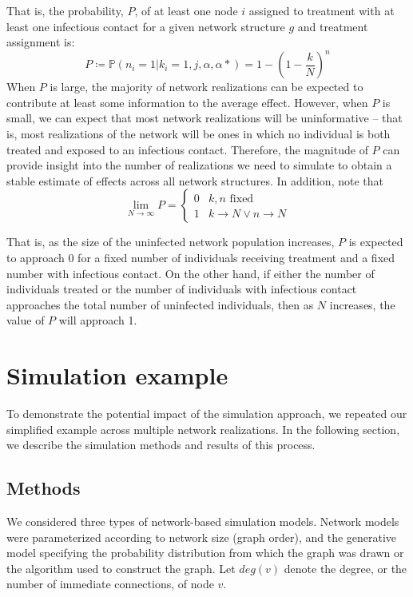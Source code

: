 \documentclass{article}
\theoremstyle{definition}
\begin{document}
That is, the probability, $P$, of at least one node $i$ assigned to treatment with at least one infectious contact for a given network structure $g$ and treatment assignment is:
\begin{equation}\label{eq:18}
    P \coloneqq \mathbb{P}\left(n_{i}=1 \vert k_{i}=1,j,\alpha,\alpha*\right)=1-\left(1-\frac{k}{N}\right)^{n}
\end{equation}
When $P$ is large, the majority of network realizations can be expected to contribute at least some information to the average effect. However, when $P$ is small, we can expect that most network realizations will be uninformative -- that is, most realizations of the network will be ones in which no individual is both treated and exposed to an infectious contact. Therefore, the magnitude of $P$ can provide insight into the number of realizations we need to simulate to obtain a stable estimate of effects across all network structures. In addition, note that
\begin{equation}\label{eq:19}
    \lim_{N \to \infty}P=\begin{cases}0 & k,n \text{ fixed} \\ 1 & k \to N \lor n \to N  \end{cases}
\end{equation}

That is, as the size of the uninfected network population increases, $P$ is expected to approach 0 for a fixed number of individuals receiving treatment and a fixed number with infectious contact. On the other hand, if either the number of individuals treated or the number of individuals with infectious contact approaches the total number of uninfected individuals, then as $N$ increases, the value of $P$ will approach 1.

\section{Simulation example}
To demonstrate the potential impact of the simulation approach, we repeated our simplified example across multiple network realizations. In the following section, we describe the simulation methods and results of this process.

 \subsection{Methods}
We considered three types of network-based simulation models. Network models were parameterized according to network size (graph order), and the generative model specifying the probability distribution from which the graph was drawn or the algorithm used to construct the graph. Let $deg(v)$ denote the degree, or the number of immediate connections, of node $v$.
\end{document}
